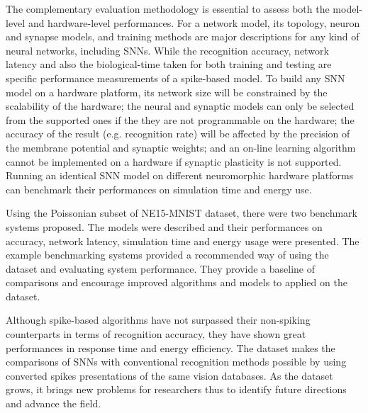 The complementary evaluation methodology is essential to assess both the model-level and hardware-level performances.
For a network model, its topology, neuron and synapse models, and training methods are major descriptions for any kind of neural networks, including SNNs.
While the recognition accuracy, network latency and also the biological-time taken for both training and testing are specific performance measurements of a spike-based model.
To build any SNN model on a hardware platform, its network size will be constrained by the scalability of the hardware;
the neural and synaptic models can only be selected from the supported ones if the they are not programmable on the hardware;
the accuracy of the result (e.g. recognition rate) will be affected by the precision of the membrane potential and synaptic weights;
and an on-line learning algorithm cannot be implemented on a hardware if synaptic plasticity is not supported.
Running an identical SNN model on  different neuromorphic hardware platforms can benchmark their performances on simulation time and energy use.


Using the Poissonian subset of NE15-MNIST dataset, there were two benchmark systems proposed. 
The models were described and their performances on accuracy, network latency, simulation time and energy usage were presented.
The example benchmarking systems provided a recommended way of using the dataset and evaluating system performance.
They provide a baseline of comparisons and encourage improved algorithms and models to applied on the dataset. 

Although spike-based algorithms have not surpassed their non-spiking counterparts in terms of recognition accuracy, they have shown great performances in response time and energy efficiency.
The dataset makes the comparisons of SNNs with conventional recognition methods possible by using converted spikes presentations of the same vision databases.
As the dataset grows, it brings new problems for researchers thus to identify future directions and advance the field.
